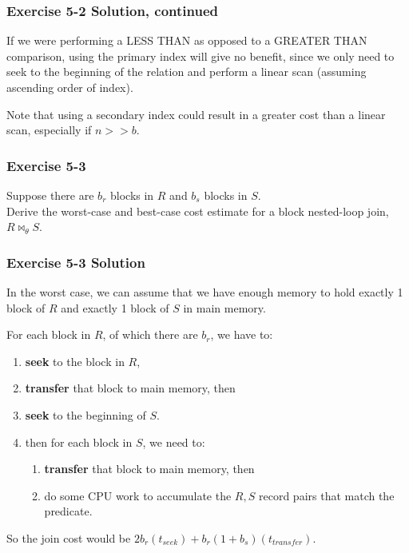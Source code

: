 \begin{frame}
\frametitle{Exercise 5-2 Solution, continued}

If we were performing a LESS THAN as opposed to a GREATER THAN comparison, using the primary index will give no benefit, since we only need to seek to the beginning of the relation and perform a linear scan (assuming ascending order of index).

Note that using a secondary index could result in a greater cost than a linear scan, especially if $n >> b$.

\end{frame}


\begin{frame}
\frametitle{Exercise 5-3}

Suppose there are $b_r$ blocks in $R$ and $b_s$ blocks in $S$. \\
Derive the worst-case and best-case cost estimate for a block nested-loop join, $R \bowtie_{\theta} S$.

\end{frame}


\begin{frame}
\frametitle{Exercise 5-3 Solution}

In the worst case, we can assume that we have enough memory to hold exactly 1 block of $R$ and exactly 1 block of $S$ in main memory.

For each block in $R$, of which there are $b_r$, we have to:

\begin{enumerate}
  \item \textbf{seek} to the block in $R$,
  \item \textbf{transfer} that block to main memory, then
  \item \textbf{seek} to the beginning of $S$.
  \item then for each block in $S$, we need to:
  \begin{enumerate}
    \item \textbf{transfer} that block to main memory, then
    \item do some CPU work to accumulate the $R, S$ record pairs that match the predicate.
  \end{enumerate}
\end{enumerate}

So the join cost would be $2b_r(t_{seek}) + b_r(1 + b_s)(t_{transfer})$.

\end{frame}


